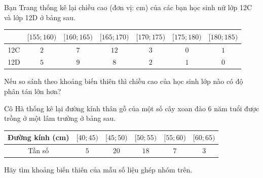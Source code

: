 \begin{vd}%
	Bạn Trang thống kê lại chiều cao (đơn vị: cm) của các bạn học sinh nữ lớp 12C và lớp 12D
	ở bảng sau.
	\begin{center}
		\begin{tabular}{|c|c|c|c|c|c|c|}
			\hline
			\diagbox[width=8em]{Lớp}{Chiều cao} & $[155;160)$ & $[160;165)$ & $[165;170)$ & $[170;175)$ & $[175;180)$ & $[180;185)$ \\
			\hline
			12C & $2$ & $7$ & $12$ & $3$ & $0$ & $1$ \\
			\hline
			12D & $5$ & $9$ & $8$ & $2$ & $1$ & $0$ \\
			\hline
		\end{tabular}
	\end{center}	
	Nếu so sánh theo khoảng biến thiên thì chiều cao của học sinh lớp nào có độ phân tán lớn hơn?
\end{vd}

\begin{bt}[Mức độ 1]%
	Cô Hà thống kê lại đường kính thân gỗ của một số cây xoan đào 6 năm tuổi được trồng ở một lâm trường ở bảng sau.
	\begin{center}
		\begin{tabular}{|c|c|c|c|c|c|}
			\hline
			Đường kính (cm) & $[40;45)$ & $[45;50)$ & $[50;55)$ & $[55;60)$ & $[60;65)$ \\
			\hline
			Tần số & $5$ & $20$ & $18$ & $7$ & $3$ \\
			\hline
		\end{tabular}
	\end{center}
	Hãy tìm khoảng biến thiên của mẫu số liệu ghép nhóm trên.
\end{bt}


